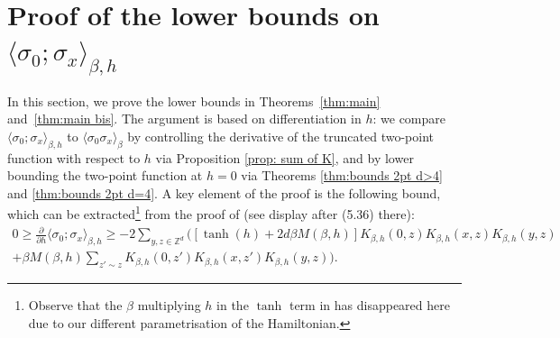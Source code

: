 \documentclass[11pt,a4paper]{article}
\numberwithin{equation}{section}
\theoremstyle{plain}
\theoremstyle{definition}
\begin{document}
\section{Proof of the lower bounds on $\langle \sigma_0;\sigma_x\rangle_{\beta,h}$}\label{sec:lower bounds}
In this section, we prove the lower bounds in Theorems~\ref{thm:main} 
and~\ref{thm:main bis}. The argument is based on differentiation in $h$: 
we compare $\langle\sigma_0;\sigma_x\rangle_{\beta,h}$ to 
$\langle\sigma_0\sigma_x\rangle_{\beta}$ by controlling the derivative of 
the truncated two-point function with respect to $h$ via 
Proposition \ref{prop: sum of K}, and by lower 
bounding the two-point function at $h=0$ via Theorems \ref{thm:bounds 2pt d>4} and \ref{thm:bounds 2pt d=4}. A key element of the proof is the following bound, which can be extracted\footnote{Observe that the $\beta$ multiplying $h$ in the $\tanh$ term in \cite{AizenmanFernandezCriticalBehaviorMagnetization1986} has disappeared here due to our different parametrisation of the Hamiltonian.} from the proof of \cite[Theorem~5.7]{AizenmanFernandezCriticalBehaviorMagnetization1986} (see display after (5.36) there):
\begin{multline}\label{eq: lb on derivative in h of 2pt}
	0\geq \frac{\partial}{\partial h}\langle \sigma_0;\sigma_x\rangle_{\beta,h}\geq -2\sum_{y,z\in \mathbb Z^d}\Big([\tanh(h)+2d\beta M(\beta,h)]K_{\beta,h}(0,z)K_{\beta,h}(x,z)K_{\beta,h}(y,z)\\+\beta M(\beta,h)\sum_{z'\sim z}K_{\beta,h}(0,z')K_{\beta,h}(x,z')K_{\beta,h}(y,z)\Big).
\end{multline}
\end{document}
